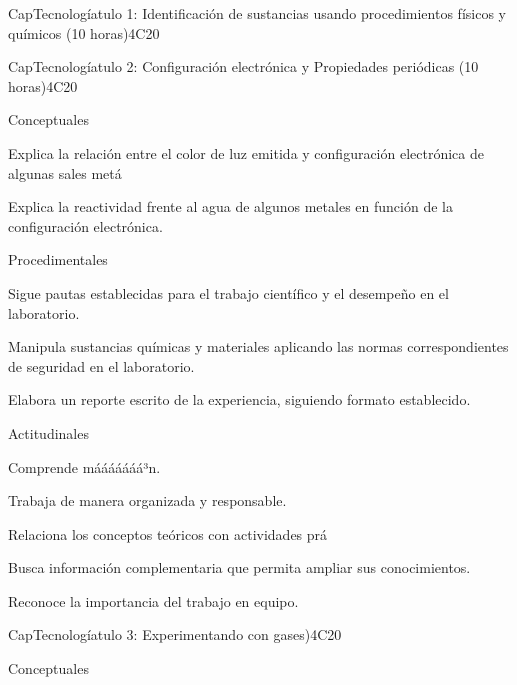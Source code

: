 \begin{syllabus}
\begin{unit}{CapTecnologíatulo 1: Identificación de sustancias usando procedimientos físicos y quí­micos (10 horas)}{}{}{4}{C20}
   \begin{learningoutcomes}
      \item 
   \end{learningoutcomes}
\end{unit}

\begin{unit}{CapTecnologíatulo 2: Configuración electrónica y Propiedades periódicas (10 horas)}{}{}{4}{C20}

Conceptuales

\begin{topics}
      \item Explica la relación entre el color de luz emitida y configuración electrónica de algunas sales metá
      \item Explica la reactividad frente al agua de algunos metales en función de la configuración electrónica.
   \end{topics}
   
   Procedimentales

\begin{topics}
      \item Sigue pautas establecidas para el trabajo científico y el desempeño en el laboratorio.
      \item Manipula sustancias químicas y materiales aplicando las normas correspondientes de seguridad en el laboratorio.
      \item Elabora un reporte escrito de la experiencia, siguiendo formato establecido.
   \end{topics}
   
   Actitudinales

\begin{topics}
      \item Comprende mááááááá³n.
      \item Trabaja de manera organizada y responsable.
      \item Relaciona los conceptos teóricos con actividades prá
      \item Busca información complementaria que permita ampliar sus conocimientos.
     \item Reconoce la importancia del trabajo en equipo.
   \end{topics}

\end{unit}

\begin{unit}{CapTecnologíatulo 3: Experimentando con gases)}{}{}{4}{C20}

Conceptuales


\end{unit}
\end{syllabus}
